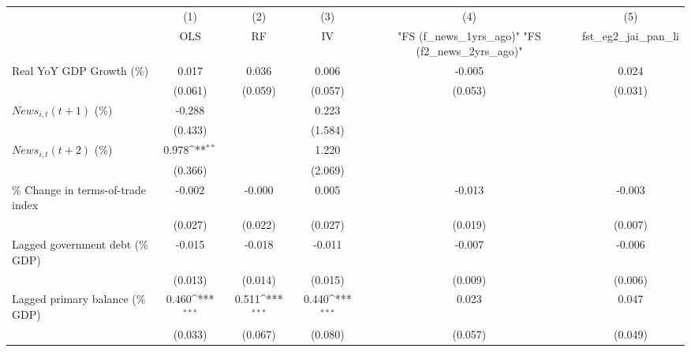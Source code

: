 {
\def\sym#1{\ifmmode^{#1}\else\(^{#1}\)\fi}
\begin{tabular}{l*{5}{c}}
\toprule
                    &\multicolumn{1}{c}{(1)}&\multicolumn{1}{c}{(2)}&\multicolumn{1}{c}{(3)}&\multicolumn{1}{c}{(4)}&\multicolumn{1}{c}{(5)}\\
                    &\multicolumn{1}{c}{OLS}&\multicolumn{1}{c}{RF}&\multicolumn{1}{c}{IV}&\multicolumn{1}{c}{ "FS (f_news_1yrs_ago)"  "FS (f2_news_2yrs_ago)" }&\multicolumn{1}{c}{fst_eg2_jai_pan_li}\\
\midrule
Real YoY GDP Growth (\%)&       0.017         &       0.036         &       0.006         &      -0.005         &       0.024         \\
                    &     (0.061)         &     (0.059)         &     (0.057)         &     (0.053)         &     (0.031)         \\
\addlinespace
$ News_{i,t}(t+1)$ (\%)&      -0.288         &                     &       0.223         &                     &                     \\
                    &     (0.433)         &                     &     (1.584)         &                     &                     \\
\addlinespace
$ News_{i,t}(t+2)$ (\%)&       0.978\sym{**} &                     &       1.220         &                     &                     \\
                    &     (0.366)         &                     &     (2.069)         &                     &                     \\
\addlinespace
\% Change in terms-of-trade index&      -0.002         &      -0.000         &       0.005         &      -0.013         &      -0.003         \\
                    &     (0.027)         &     (0.022)         &     (0.027)         &     (0.019)         &     (0.007)         \\
\addlinespace
Lagged government debt (\% GDP)&      -0.015         &      -0.018         &      -0.011         &      -0.007         &      -0.006         \\
                    &     (0.013)         &     (0.014)         &     (0.015)         &     (0.009)         &     (0.006)         \\
\addlinespace
Lagged primary balance (\% GDP)&       0.460\sym{***}&       0.511\sym{***}&       0.440\sym{***}&       0.023         &       0.047         \\
                    &     (0.033)         &     (0.067)         &     (0.080)         &     (0.057)         &     (0.049)         \\

\end{tabular}}
